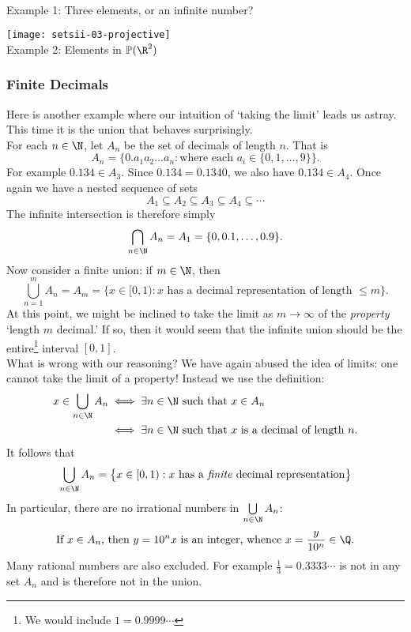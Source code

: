 \begin{center}
\begin{minipage}[b]{0.45\textwidth}
\centering
{}\\[15pt]
Example 1: Three elements, or an infinite number?
\end{minipage}\qquad\qquad
\begin{minipage}[b]{0.35\textwidth}
\centering
\texttt{[image: setsii-03-projective]}\\
Example 2: Elements in $\mathbb P(\R^2)$
\end{minipage}
\end{center}


\subsubsection*{Finite Decimals}\label{ex:finitedec}

Here is another example where our intuition of `taking the limit' leads us astray. This time it is the union that behaves surprisingly.\\

\noindent For each $n\in\N$, let $A_n$ be the set of decimals of length $n$. That is
\[A_n=\bigl\{0.a_1a_2\ldots a_n:\text{where each $a_i\in\{0,1,\ldots,9\}$}\bigr\}.\]
For example $0.134\in A_3$. Since $0.134=0.1340$, we also have $0.134\in A_4$. Once again we have a nested sequence of sets
\[A_1\subseteq A_2\subseteq A_3\subseteq A_4\subseteq\cdots\]
The infinite intersection is therefore simply
\[\bigcap_{n\in\N}A_n=A_1=\{0,0.1,\ldots,0.9\}.\]
Now consider a finite union: if $m\in\N$, then
\[\bigcup_{n=1}^mA_n=A_m=\bigl\{x\in [0,1):x\text{ has a decimal representation of length $\le m$}\bigr\}.\]
At this point, we might be inclined to take the limit as $m\to\infty$ of the \emph{property} `length $m$ decimal.' If so, then it would seem that the infinite union should be the entire\footnote{We would include $1=0.9999\cdots$} interval $[0,1]$.\\
What is wrong with our reasoning? We have again abused the idea of limits: one cannot take the limit of a property! Instead we use the definition:
\begin{align*}
x\in\bigcup_{n\in\N}A_n&\iff\exists n\in\N\text{ such that }x\in A_n\\
&\iff\exists n\in\N \text{ such that $x$ is a decimal of length $n$.}
\end{align*}
It follows that
\[\bigcup_{n\in\N}A_n=\big\{x\in[0,1):x\text{ has a \emph{finite} decimal representation}\big\}\]
In particular, there are no irrational numbers in $\bigcup\limits_{n\in\N}A_n$:
\[\text{If $x\in A_n$, then $y=10^nx$ is an integer, whence $x=\frac y{10^n}\in\Q$.}\]
Many rational numbers are also excluded. For example $\frac 13=0.3333\cdots$ is not in any set $A_n$ and is therefore not in the union.


